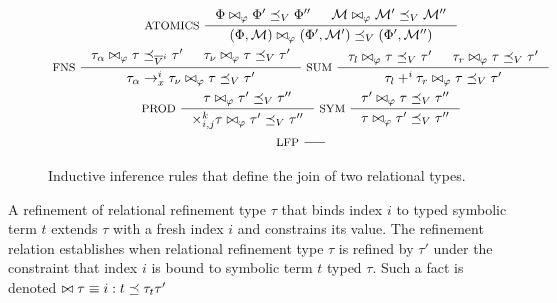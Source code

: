 \begin{figure}
  \centering
  \begin{gather*}
    \inference[ ATOMICS ]{
      \Phi \join{ \varphi } \Phi' \subtype_V \Phi'' &
      \mathcal{M} \join{ \varphi } \mathcal{M}' \subtype_V \mathcal{M}'' }{
      (\Phi, \mathcal{M}) \join{ \varphi } (\Phi', \mathcal{M}') \subtype_V %
      (\Phi', \mathcal{M}'') } \\
    \inference[ FNS ]{
      \tau_{\alpha} \join{ \varphi } \tau \subtype_{ \invert{V}{i} } \tau' &
      \tau_{\nu} \join{ \varphi } \tau \subtype_{ V } %
      \tau' }{
      \tau_{\alpha} \to_x^i \tau_{\nu} \join{ \varphi } \tau \subtype_{V} %
      \tau' }
    \inference[ SUM ]{
      \tau_l \join{ \varphi } \tau \subtype_V \tau' &
      \tau_r \join{ \varphi } \tau \subtype_V \tau' }{
      \tau_l +^i \tau_r \join{ \varphi } \tau \subtype_V \tau' } \\
    \inference[ PROD ]{
      \tau \join{ \varphi } \tau' \subtype_V \tau'' }{
      \times_{i, j}^k \tau \join{ \varphi } \tau' \subtype_V \tau'' } 
    \inference[ SYM ]{ %
      \tau' \join{ \varphi } \tau \subtype_V \tau'' }{ %
      \tau \join{ \varphi } \tau' \subtype_V \tau'' } \\
    \inference[ LFP ]{ }{ } 
  \end{gather*}
  \caption{Inductive inference rules that define the join of two relational types.
     }
  \label{fig:join}
\end{figure}


A refinement of relational refinement type $\tau$ that binds index $i$
to typed symbolic term $t$ extends $\tau$ with a fresh index $i$ and
constrains its value.
%
The refinement relation establishes when relational refinement type
$\tau$ is refined by $\tau'$ under the constraint that index $i$ is
bound to symbolic term $t$ typed $\tau$.
%
Such a fact is denoted $\bowtie \tau \equiv i : t \preceq{\tau_t}{\tau'}$

